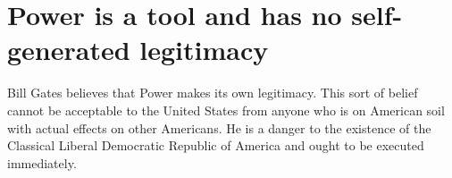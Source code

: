 \documentclass{amsart}
\begin{document}
\section{Power is a tool and has no self-generated legitimacy}

Bill Gates believes that Power makes its own legitimacy.  This sort of belief cannot be acceptable to the United States from anyone who is on American soil with actual effects on other Americans.  He is a danger to the existence of the Classical Liberal Democratic Republic of America and ought to be executed immediately.
\end{document}

